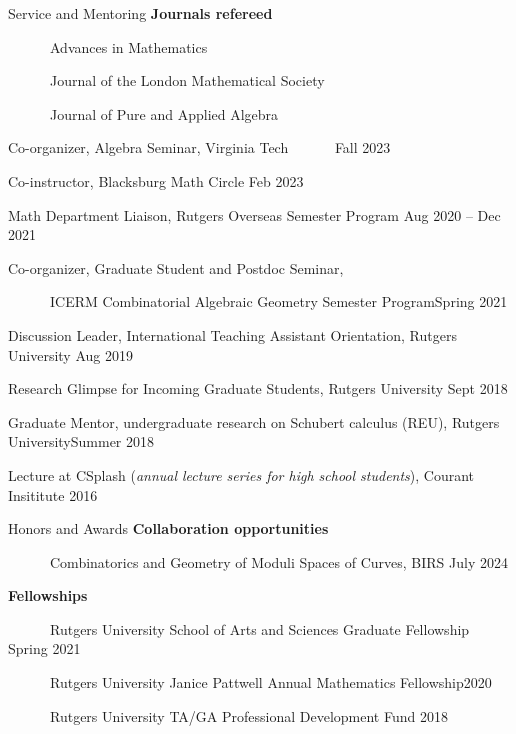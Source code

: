 \documentclass{resume} %
\begin{document}
\begin{rSection}{Service and Mentoring}
    {\bf Journals refereed}
    
    \mbox{\ \ \ \ \ \ }Advances in Mathematics
    
    \mbox{\ \ \ \ \ \ }Journal of the London Mathematical Society 
    
    \mbox{\ \ \ \ \ \ }Journal of Pure and Applied Algebra

    Co-organizer, Algebra Seminar, Virginia Tech 
    \mbox{\ \ \ \ \ \ }\hfill{Fall 2023}

    Co-instructor, Blacksburg Math Circle \hfill{Feb 2023}

    Math Department Liaison, Rutgers Overseas Semester Program \hfill{Aug 2020 -- Dec 2021}

    Co-organizer, Graduate Student and Postdoc Seminar,

    \mbox{\ \ \ \ \ \ }ICERM Combinatorial Algebraic Geometry Semester Program\hfill{Spring 2021}

    Discussion Leader, International Teaching Assistant Orientation, Rutgers University \hfill{Aug 2019}

    Research Glimpse for Incoming Graduate Students, Rutgers University \hfill{Sept 2018}

    Graduate Mentor, undergraduate research on Schubert calculus (REU), Rutgers University\hfill{Summer 2018}

    Lecture at CSplash (\emph{annual lecture series for high school students}), Courant Insititute \hfill{2016}
\end{rSection} 

\begin{rSection}{Honors and Awards}
    {\bf Collaboration opportunities}

    \mbox{\ \ \ \ \ \ }Combinatorics and Geometry of Moduli Spaces of Curves, BIRS \hfill{July 2024}

    {\bf Fellowships}

    \mbox{\ \ \ \ \ \ }Rutgers University School of Arts and Sciences Graduate Fellowship \hfill{Spring 2021}

    \mbox{\ \ \ \ \ \ }Rutgers University Janice Pattwell Annual Mathematics Fellowship\hfill{2020}

    \mbox{\ \ \ \ \ \ }Rutgers University TA/GA Professional Development Fund \hfill{2018}
\end{rSection}
\end{document}
